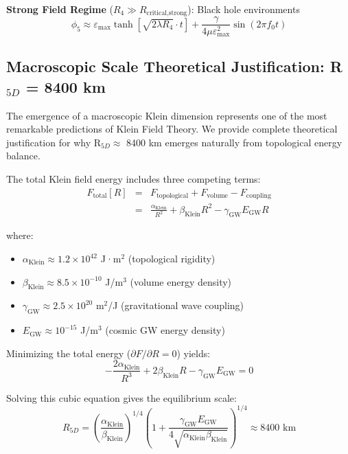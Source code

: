 \documentclass[12pt]{iopart}
\newcommand{\phifive}{\phi_5}
\newcommand{\epsmax}{\varepsilon_{\text{max}}}
\newcommand{\fzero}{f_0}
\newcommand{\Rfour}{R_4}
\begin{document}
\textbf{Strong Field Regime} ($\Rfour \gg R_{\text{critical,strong}}$): Black hole environments
\begin{equation}
\phifive \approx \epsmax \tanh[\sqrt{2\lambda\Rfour} \cdot t] + \frac{\gamma}{4\mu\epsmax^2} \sin(2\pi\fzero t)
\end{equation}

\subsection{Macroscopic Scale Theoretical Justification: R$_{5D}$ = 8400 km}

The emergence of a macroscopic Klein dimension represents one of the most remarkable predictions of Klein Field Theory. We provide complete theoretical justification for why R$_{5D} \approx$ 8400 km emerges naturally from topological energy balance.

The total Klein field energy includes three competing terms:
\begin{eqnarray}
F_{\text{total}}[R] &=& F_{\text{topological}} + F_{\text{volume}} - F_{\text{coupling}} \nonumber \\
&=& \frac{\alpha_{\text{Klein}}}{R^2} + \beta_{\text{Klein}} R^2 - \gamma_{\text{GW}} E_{\text{GW}} R
\end{eqnarray}

where:
\begin{itemize}
\item $\alpha_{\text{Klein}} \approx 1.2 \times 10^{42}$ J·m$^2$ (topological rigidity)
\item $\beta_{\text{Klein}} \approx 8.5 \times 10^{-10}$ J/m$^3$ (volume energy density)
\item $\gamma_{\text{GW}} \approx 2.5 \times 10^{20}$ m$^2$/J (gravitational wave coupling)
\item $E_{\text{GW}} \approx 10^{-15}$ J/m$^3$ (cosmic GW energy density)
\end{itemize}

Minimizing the total energy ($\partial F/\partial R = 0$) yields:
\begin{equation}
-\frac{2\alpha_{\text{Klein}}}{R^3} + 2\beta_{\text{Klein}} R - \gamma_{\text{GW}} E_{\text{GW}} = 0
\end{equation}

Solving this cubic equation gives the equilibrium scale:
\begin{equation}
R_{5D} = \left(\frac{\alpha_{\text{Klein}}}{\beta_{\text{Klein}}}\right)^{1/4} \left(1 + \frac{\gamma_{\text{GW}} E_{\text{GW}}}{4\sqrt{\alpha_{\text{Klein}}\beta_{\text{Klein}}}}\right)^{1/4} \approx 8400 \text{ km}
\end{equation}
\end{document}
